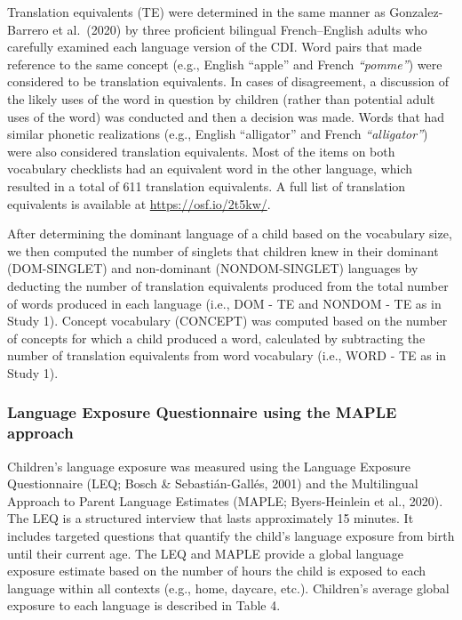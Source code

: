\documentclass[
  english,
  ,man,floatsintext]{apa6}
\begin{document}
Translation equivalents (TE) were determined in the same manner as Gonzalez-Barrero et al.~(2020) by three proficient bilingual French--English adults who carefully examined each language version of the CDI. Word pairs that made reference to the same concept (e.g., English ``apple'' and French \emph{``pomme''}) were considered to be translation equivalents. In cases of disagreement, a discussion of the likely uses of the word in question by children (rather than potential adult uses of the word) was conducted and then a decision was made. Words that had similar phonetic realizations (e.g., English ``alligator'' and French \emph{``alligator''}) were also considered translation equivalents. Most of the items on both vocabulary checklists had an equivalent word in the other language, which resulted in a total of 611 translation equivalents. A full list of translation equivalents is available at \url{https://osf.io/2t5kw/}.

After determining the dominant language of a child based on the vocabulary size, we then computed the number of singlets that children knew in their dominant (DOM-SINGLET) and non-dominant (NONDOM-SINGLET) languages by deducting the number of translation equivalents produced from the total number of words produced in each language (i.e., DOM - TE and NONDOM - TE as in Study 1). Concept vocabulary (CONCEPT) was computed based on the number of concepts for which a child produced a word, calculated by subtracting the number of translation equivalents from word vocabulary (i.e., WORD - TE as in Study 1).

\hypertarget{language-exposure-questionnaire-using-the-maple-approach}{%
\subsubsection{Language Exposure Questionnaire using the MAPLE approach}\label{language-exposure-questionnaire-using-the-maple-approach}}

Children's language exposure was measured using the Language Exposure Questionnaire (LEQ; Bosch \& Sebastián-Gallés, 2001) and the Multilingual Approach to Parent Language Estimates (MAPLE; Byers-Heinlein et al., 2020). The LEQ is a structured interview that lasts approximately 15 minutes. It includes targeted questions that quantify the child's language exposure from birth until their current age. The LEQ and MAPLE provide a global language exposure estimate based on the number of hours the child is exposed to each language within all contexts (e.g., home, daycare, etc.). Children's average global exposure to each language is described in Table 4.
\end{document}
